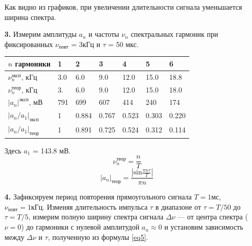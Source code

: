 \documentclass[a4paper,12pt]{article}
\theoremstyle{definition}
\begin{document}
\begin{enumerate}
Как видно из графиков, при увеличении длительности сигнала уменьшается ширина спектра.

\item [\textbf{3.}] Измерим амплитуды $a_n$ и частоты $\nu_n$ спектральных гармоник при фиксированных $\nu_\text{повт}$ = 3кГц и $\tau$ = 50 мкс.

\begin{table}[!h]
\centering
\begin{tabular}{|l|l|l|l|l|l|l|}
\hline
$n$ гармоники & 1 & 2 & 3 & 4 & 5 & 6\\ \hline
$\nu_n^\text{эксп}$, кГц & 3.0 & 6.0 & 9.0 & 12.0 & 15.0 & 18.8 \\ \hline
$\nu_n^\text{теор}$, кГц & 3. & 6.0 & 9.0 & 12.0 & 15.0 & 18.0 \\ \hline
$|a_n|^\text{эксп}$, мВ & 791 & 699 & 607 & 414 & 240 & 174\\ \hline
$|a_n/a_1|_\text{эксп}$ & 1 & 0.884 & 0.767 & 0.523 & 0.303 & 0.220 \\ \hline
$|a_n/a_1|_\text{теор}$ & 1 & 0.891 & 0.725 & 0.524 & 0.312 & 0.114\\ \hline
\end{tabular}
\end{table}

Здесь $a_1$ = 143.8 мВ.
$$\nu_n^\text{теор} = \frac{n}{T}$$
$$|a_n|_\text{теор} = \frac{|\text{sin}\frac{\pi n \tau}{T}|}{\pi n}$$

\item[\textbf{4.}] Зафиксируем период повторения прямоугольного сигнала $T = 1 \text{мс}$, $\nu_\text{повт} = 1\text{кГц}$. Изменяя длительность импульса $\tau$ в диапазоне от 
$\tau=T/50$ до $\tau=T/5$, измерим полную ширину спектра сигнала $\Delta \nu$ — от центра спектра ($\nu = 0$) до гармоники с нулевой амплитудой $a_n \approx 0$ и установим зависимость между $\Delta \nu$ и $\tau$, полученную из формулы \ref{eq5}.


\end{enumerate}
\end{document}
